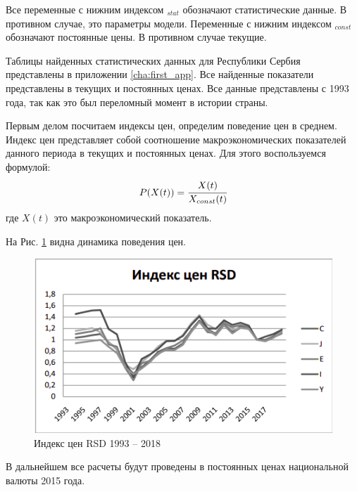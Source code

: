 Все переменные с нижним индексом $_{stat}$ обозначают статистические данные.
В противном случае, это параметры модели.
Переменные с нижним индексом $_{const}$ обозначают постоянные цены.
В противном случае текущие.

Таблицы найденных статистических данных для Республики Сербия  представлены в приложении \ref{cha:first_app}.
Все найденные показатели представлены в текущих и постоянных ценах.
Все данные представлены с 1993 года, так как это был переломный момент в истории страны.

Первым делом посчитаем индексы цен, определим поведение цен в среднем.
Индекс цен представляет собой соотношение макроэкономических показателей данного периода в текущих и постоянных ценах.
Для этого воспользуемся формулой:
\begin{equation}
	P(X(t)) = \cfrac{X(t)}{X_{const}(t)}
\label{F:F1}
\end{equation}
где $X(t)$ это макроэкономический показатель.

На Рис. \ref{fig:index_rsd} видна динамика поведения цен.
\begin{figure}
	\centering
	\includegraphics[width=\textwidth]{figures/index_rsd.png}
	\caption{Индекс цен RSD 1993 -- 2018}
	\label{fig:index_rsd}
\end{figure}

В дальнейшем все расчеты будут проведены в постоянных ценах национальной валюты 2015 года.
